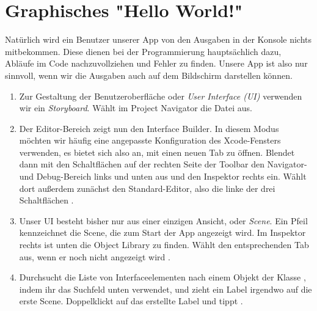 \documentclass[parskip=half, final]{scrreprt}
\begin{document}
\begin{lecture}
\begin{enumerate}
\end{enumerate}


\section{Graphisches "{}Hello World!"{}}

Natürlich wird ein Benutzer unserer App von den Ausgaben in der Konsole nichts mitbekommen. Diese dienen bei der Programmierung hauptsächlich dazu, Abläufe im Code nachzuvollziehen und Fehler zu finden. Unsere App ist also nur sinnvoll, wenn wir die Ausgaben auch auf dem Bildschirm darstellen können.


\begin{enumerate}

\item Zur Gestaltung der Benutzeroberfläche oder \emph{User Interface (UI)} verwenden wir ein \emph{Storyboard}. Wählt im Project Navigator die Datei  aus.

\item Der Editor-Bereich zeigt nun den Interface Builder. In diesem Modus möchten wir häufig eine angepasste Konfiguration des Xcode-Fensters verwenden, es bietet sich also an, mit  einen neuen Tab zu öffnen. Blendet dann mit den Schaltflächen auf der rechten Seite der Toolbar den Navigator- und Debug-Bereich links und unten aus und den Inspektor rechts ein. Wählt dort außerdem zunächst den Standard-Editor, also die linke der drei Schaltflächen .


\item Unser UI besteht bisher nur aus einer einzigen Ansicht, oder \emph{Scene}. Ein Pfeil kennzeichnet die Scene, die zum Start der App angezeigt wird. Im Inspektor rechts ist unten die Object Library zu finden. Wählt den entsprechenden Tab aus, wenn er noch nicht angezeigt wird .

\item Durchsucht die Liste von Interfaceelementen nach einem Objekt der Klasse , indem ihr das Suchfeld unten verwendet, und zieht ein Label irgendwo auf die erste Scene. Doppelklickt auf das erstellte Label und tippt .


\end{enumerate}
\end{lecture}
\end{document}
